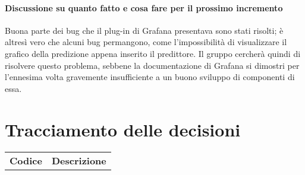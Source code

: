 \documentclass{article}
\begin{document}
\paragraph*{Discussione su quanto fatto e cosa fare per il prossimo incremento}
Buona parte dei bug che il plug-in di Grafana presentava sono stati risolti; è altresì vero che alcuni bug permangono, come l'impossibilità di visualizzare il grafico 
della predizione appena inserito il predittore. Il gruppo cercherà quindi di risolvere questo problema, sebbene la documentazione di Grafana si dimostri 
per l'ennesima volta gravemente insufficiente a un buono sviluppo di componenti di essa.

\section{Tracciamento delle decisioni}
\begin{table}[H]
  \centering
  \begin{tabular}{p{4cm}|p{12cm}}
    \rowcolor{lightgray}
    \textbf{Codice}  & \textbf{Descrizione}      \\
  \end{tabular}
\end{table}
\end{document}
